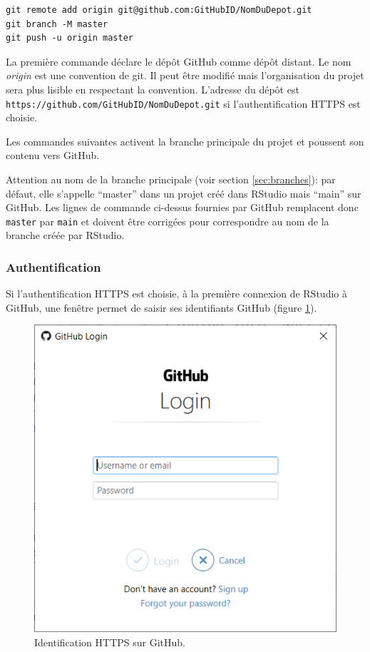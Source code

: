 \documentclass[
  12pt,
  french,
  a4paper,
  extrafontsizes,onecolumn,openright
  ]{memoir}
\begin{document}
\begin{verbatim}
git remote add origin git@github.com:GitHubID/NomDuDepot.git
git branch -M master
git push -u origin master
\end{verbatim}

La première commande déclare le dépôt GitHub comme dépôt distant.
Le nom \emph{origin} est une convention de git.
Il peut être modifié mais l'organisation du projet sera plus lisible en respectant la convention.
L'adresse du dépôt est \texttt{https://github.com/GitHubID/NomDuDepot.git} si l'authentification HTTPS est choisie.

Les commandes suivantes activent la branche principale du projet et poussent son contenu vers GitHub.

Attention au nom de la branche principale (voir section \ref{sec:branches}): par défaut, elle s'appelle \enquote{master} dans un projet créé dans RStudio mais \enquote{main} sur GitHub.
Les lignes de commande ci-dessus fournies par GitHub remplacent donc \texttt{master} par \texttt{main} et doivent être corrigées pour correspondre au nom de la branche créée par RStudio.

\subsubsection{Authentification}\label{authentification}

Si l'authentification HTTPS est choisie, à la première connexion de RStudio à GitHub, une fenêtre permet de saisir ses identifiants GitHub (figure \ref{fig:git-PAT}).



\scriptsize

\begin{figure}

{\centering \includegraphics[width=0.8\linewidth]{images/git-PAT} 

}

\caption{Identification HTTPS sur GitHub.}\label{fig:git-PAT}
\end{figure}
\end{document}
